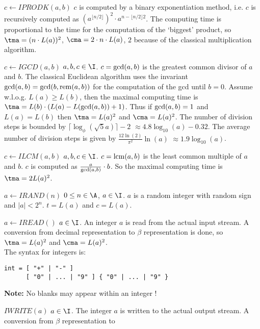 \begin{deflist}{$c \gets IPRODK(a,b)$}
     $c$ is computed by a binary exponentiation method,
     i.e. $c$ is recursively computed as 
     $(a^{\lfloor n/2 \rfloor})^2 \cdot a^{n - \lfloor n/2 \rfloor 2}$.
     The computing time is proportional to 
     the time for the computation of the `biggest' product, so  
     $\tma = (n \cdot L(a))^2$, $\cma = 2 \cdot n \cdot L(a)$, 
     $2$ because of the classical multiplication algorithm.
\item[$c \gets IGCD(a,b)$] $a, b, c \in \I$.
     $c = {\rm gcd}(a,b)$ is the greatest common divisor of $a$ and $b$.
     The classical Euclidean algorithm uses the invariant 
     ${\rm gcd}(a,b) = {\rm gcd}(b,{\rm rem}(a,b))$ for 
     the computation of the gcd until $b = 0$. 
     Assume w.l.o.g. $L(a) \geq L(b)$, 
     then the maximal computing time is  
     $\tma = L(b) \cdot ( L(a) - L( {\rm gcd}(a,b) ) + 1 )$.
     Thus if ${\rm gcd}(a,b) = 1$ and $L(a) = L(b)$ then 
     $\tma = L(a)^2$ and $\cma = L(a)^2$.
     The number of division steps is bounded by 
     $\lceil \log_{\phi}(\sqrt{5} a) \rceil - 2$  
     $\approx 4.8 \log_{10}(a) - 0.32$. 
     The average number of division steps is 
     given by 
     $\frac{12 \ln(2)}{\pi^2} \ln(a)$ 
     $\approx 1.9 \log_{10}(a)$. 
\item[$c \gets ILCM(a,b)$] $a, b, c \in \I$.
     $c = {\rm lcm}(a,b)$ is the least common multiple of $a$ and $b$.
     $c$ is computed as $\frac{a}{{\rm gcd}(a,b)} \cdot b$.
     So the maximal computing time is  
     $\tma = 2 L(a)^2$.  
\item[$a \gets IRAND(n)$] $0 \leq n \in \A$, $a \in \I$.
     $a$ is a random integer with random sign and 
     $\vert a \vert < 2^n$. $t = L(a)$ and $c = L(a)$.
\item[$a \gets IREAD()$] $a \in \I$.
     An integer $a$ is read from the actual input stream.
     A conversion from decimal representation to 
     $\beta$ representation is done, so
     $\tma = L(a)^2$ and $\cma = L(a)^2$. \\
     The syntax for integers is:
\begin{verbatim}
int = [ "+" | "-" ] 
      [ "0" | ... | "9" ] { "0" | ... | "9" }
\end{verbatim}
     {\bf Note:} No blanks may appear within an integer !
\item[$IWRITE(a)$] $a \in \I$.
     The integer $a$ is written to the actual output stream.
     A conversion from $\beta$ representation to 

\end{deflist}
